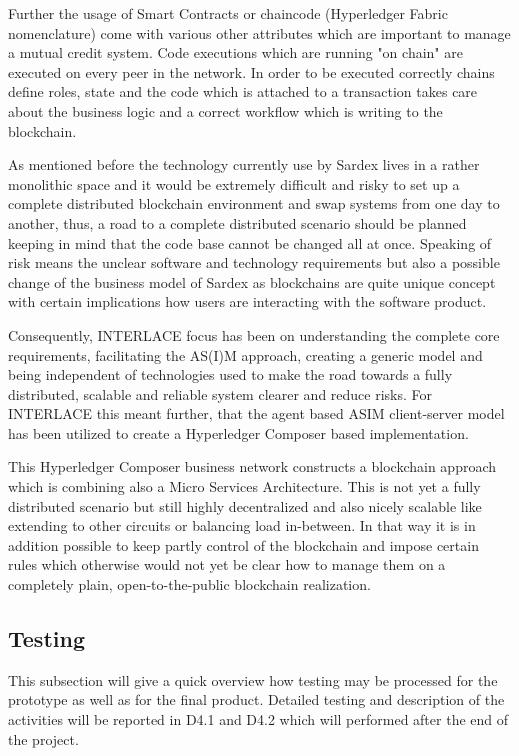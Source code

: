 Further the usage of Smart Contracts or chaincode (Hyperledger Fabric nomenclature) come with various other attributes which are important to manage a mutual credit system. Code executions which are running "on chain" are executed on every peer in the network. In order to be executed correctly chains define roles, state and the code which is attached to a transaction takes care about the business logic and a correct workflow which is writing to the blockchain.

As mentioned before the technology currently use by Sardex lives in a rather monolithic space and it would be extremely difficult and risky to set up a complete distributed blockchain environment and swap systems from one day to another, thus, a road to a complete distributed scenario should be planned keeping in mind that the code base cannot be changed all at once. Speaking of risk means the unclear software and technology requirements but also a possible change of the business model of Sardex as blockchains are quite unique concept with certain implications how users are interacting with the software product.

Consequently, INTERLACE focus has been on understanding the complete core requirements, facilitating the AS(I)M approach, creating a generic model and being independent of technologies used to make the road towards a fully distributed, scalable and reliable system clearer and reduce risks. For INTERLACE this meant further, that the agent based ASIM client-server model has been utilized to create a Hyperledger Composer based implementation.

This Hyperledger Composer business network constructs a blockchain approach which is combining also a Micro Services Architecture. This is not yet a fully distributed scenario but still highly decentralized and also nicely scalable like extending to other circuits or balancing load in-between. In that way it is in addition possible to keep partly control of the blockchain and impose certain rules which otherwise would not yet be clear how to manage them on a completely plain, open-to-the-public blockchain realization.

\subsection{Testing}

This subsection will give a quick overview how testing may be processed for the prototype as well as for the final product. Detailed testing and description of the activities will be reported in D4.1 and D4.2 which will performed after the end of the project.

